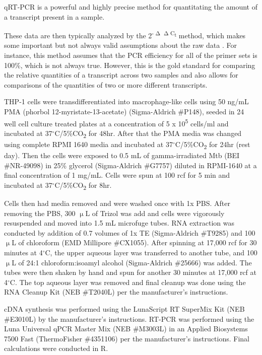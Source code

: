 qRT-PCR is a powerful and highly precise method for quantitating the amount of a transcript present in a sample. 

These data are then typically analyzed by the 2\textsuperscript{-$\upDelta\upDelta$C\textsubscript{t}} method, which makes some important but not always valid assumptions about the raw data \citep{Livak2001}. For instance, this method assumes that the PCR efficiency for all of the primer sets is 100\%, which is not always true. However, this is the gold standard for comparing the relative quantities of a transcript across two samples and also allows for comparisons of the quantities of two or more different transcripts. 

THP-1 cells were transdifferentiated into macrophage-like cells using 50 ng/mL PMA (phorbol 12-myristate-13-acetate) (Sigma-Aldrich \#P148), seeded in 24 well cell culture treated plates at a concentration of 5 x 10\textsuperscript{5} cells/ml and incubated at 37$^{\circ}$C/5\%CO\textsubscript{2} for 48hr. After that the PMA media was changed using complete RPMI 1640 media and incubated at 37$^{\circ}$C/5\%CO\textsubscript{2} for 24hr (rest day). Then the cells were exposed to 0.5 mL of gamma-irradiated Mtb (BEI \#NR-49098) in 25\% glycerol (Sigma-Aldrich \#G7757) diluted in RPMI-1640 at a final concentration of 1 mg/mL. Cells were spun at 100 rcf for 5 min and incubated at 37$^{\circ}$C/5\%CO\textsubscript{2} for 8hr.

Cells then had media removed and were washed once with 1x PBS. After removing the PBS, 300 $\upmu$L of Trizol was add and cells were vigorously resuspended and moved into 1.5 mL microfuge tubes. RNA extraction was conducted by addition of 0.7 volumes of 1x TE (Sigma-Aldrich \#T9285) and 100 $\upmu$L of chloroform (EMD Millipore \#CX1055). After spinning at 17,000 rcf for 30 minutes at 4$^{\circ}$C, the upper aqueous layer was transferred to another tube, and 100 $\upmu$L of 24:1 chloroform:isoamyl alcohol (Sigma-Aldrich \#25666) was added. The tubes were then shaken by hand and spun for another 30 minutes at 17,000 rcf at 4$^{\circ}$C. The top aqueous layer was removed and final cleanup was done using the RNA Cleanup Kit (NEB \#T2040L) per the manufacturer's instructions.

cDNA synthesis was performed using the LunaScript RT SuperMix Kit (NEB \#E3010L) by the manufacturer's instructions. RT-PCR was performed using the Luna Universal qPCR Master Mix (NEB \#M3003L) in an Applied Biosystems 7500 Fast (ThermoFisher \#4351106) per the manufacturer's instructions. Final calculations were conducted in R. 


